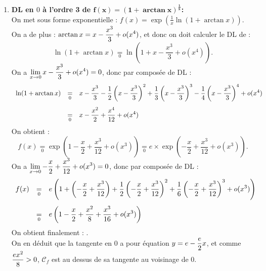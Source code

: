 \documentclass[a4paper, 11pt,reqno]{article}
\begin{document}
\begin{correction}
\begin{enumerate}
		      en utilisant les formules de trigonom\'etrie. On a $\ddp \frac{\pi}{6}x^2 - \frac{11\pi}{90}x^4 + o(x^4)$ qui tend vers $0$ en $0$, donc on peut composer les DL, et on obtient :
		      .\\
		      On en d\'eduit que la tangente en $0$ a pour \'equation $y=0$, et comme $ \ddp\frac{\pi}{6}x^2>0$, $\mathcal{C}_f$ est au dessus de sa tangente au voisinage de $0$.
		\item \textbf{DL en $0$  \`a l'ordre 3 de $\mathbf{f(x)=\left(1+\arctan{x}\right)^{\frac{1}{x}}}$:}\\
		      On met sous forme exponentielle : $f(x) = \exp\left(\frac{1}{x}\ln \left(1+\arctan x\right)\right)$. \\
		      On a de plus : $\displaystyle \arctan x = x - \frac{x^3}{3} + o(x^4)$, et donc on doit calculer le DL de :
		      $$ \ln(1+\arctan x) \underset{0}{=} \ln \left( 1 + x - \frac{x^3}{3} + o(x^4) \right).$$
		      On a $\displaystyle\lim\limits_{x \to 0} x - \frac{x^3}{3} + o(x^4) = 0$, donc par compos\'ee de DL :
		      $$\begin{array}{rcl}
				      \ln(1+\arctan x) & \underset{0}{=} & \ddp x - \frac{x^3}{3} - \frac{1}{2} \left( x - \frac{x^3}{3}\right)^2 + \frac{1}{3} \left( x - \frac{x^3}{3} \right)^3 - \frac{1}{4} \left( x - \frac{x^3}{3}\right)^4 + o(x^4)\vsec \\
				                       & \underset{0}{=} & \ddp x-\frac{x^2}{2} + \frac{x^4}{12} + o(x^4)
			      \end{array}$$
		      On obtient :
		      $$ f(x) \underset{0}{=} \exp\left(1-\frac{x}{2} + \frac{x^3}{12} + o(x^3)\right) \underset{0}{=} e\times \exp\left(-\frac{x}{2}+\frac{x^3}{12} + o(x^3)\right).$$
		      On a $\displaystyle\lim\limits_{x \to 0} -\frac{x}{2}+\frac{x^3}{12} + o(x^3) = 0$, donc par compos\'ee de DL :
		      $$\begin{array}{rcl}
				      \ddp f(x) & \underset{0}{=} & \ddp e\left(1+\left(-\frac{x}{2} + \frac{x^3}{12}\right) + \frac{1}{2}\left(-\frac{x}{2} + \frac{x^3}{12}\right)^2 + \frac{1}{6} \left(-\frac{x}{2} + \frac{x^3}{12}\right)^3 + o(x^3)\right)\vsec \\
				                & \underset{0}{=} & \ddp e\left( 1 - \frac{x}{2} + \frac{x^2}{8} + \frac{x^3}{16} + o(x^3)\right)
			      \end{array}$$
		      On obtient finalement :
		      .\\
		      On en d\'eduit que la tangente en $0$ a pour \'equation $y=e-\displaystyle\frac{e}{2} x$, et comme $\displaystyle\frac{e x^2}{8}>0$, $\mathcal{C}_f$ est au dessus de sa tangente au voisinage de $0$.
	\end{enumerate}
\end{correction}
\end{document}
